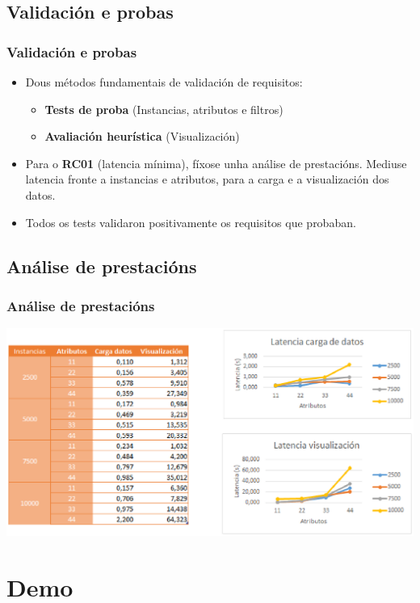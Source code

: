 \documentclass{beamer}
\begin{document}
\subsection{Validación e probas}
\begin{frame}
\frametitle{Validación e probas} 
\begin{itemize} 
\item Dous métodos fundamentais de validación de requisitos:
\begin{itemize} 
\item \textbf{Tests de proba} (Instancias, atributos e filtros)
\item \textbf{Avaliación heurística} (Visualización)
\end{itemize} 
\item Para o \textbf{RC01} (latencia mínima), fíxose unha análise de prestacións. Mediuse latencia fronte a instancias e atributos, para a carga e a visualización dos datos.
\item Todos os tests validaron positivamente os requisitos que probaban.
\end{itemize} 
\end{frame}

\subsection{Análise de prestacións}
\begin{frame}
\frametitle{Análise de prestacións} 
\includegraphics[width=\textwidth,height=\textheight,keepaspectratio]{figuras/eficiencia}
\end{frame}


\section{Demo} 
\end{document}
